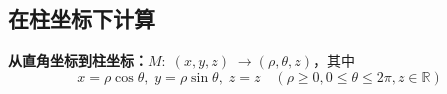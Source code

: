 \subsection{在柱坐标下计算}

{\bf 从直角坐标到柱坐标：}$M:\;(x,y,z)\;\to(\rho,\theta,z)$，其中
$$x=\rho\cos\theta,\;y=\rho\sin\theta,\;z=z\quad (\rho\geq 0,0\leq\theta\leq
2\pi,z\in\mathbb{R})$$

\begin{center}
	\quad
\end{center}

